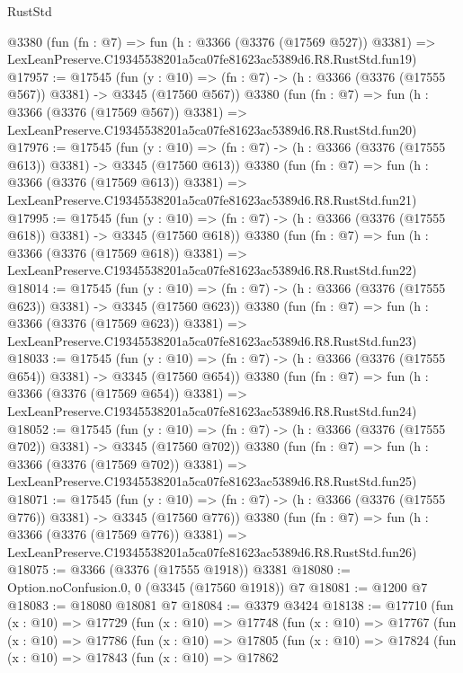 \begin{lexlean}{RustStd}
\begin{coremodule}
    @3380
    (fun (fn : @7) =>
    fun (h : @3366 (@3376 (@17569 @527)) @3381) =>
    LexLeanPreserve.C19345538201a5ca07fe81623ac5389d6.R8.RustStd.fun19)
@17957 := @17545
    (fun (y : @10) => (fn : @7) -> (h : @3366 (@3376 (@17555 @567)) @3381) -> @3345 (@17560 @567))
    @3380
    (fun (fn : @7) =>
    fun (h : @3366 (@3376 (@17569 @567)) @3381) =>
    LexLeanPreserve.C19345538201a5ca07fe81623ac5389d6.R8.RustStd.fun20)
@17976 := @17545
    (fun (y : @10) => (fn : @7) -> (h : @3366 (@3376 (@17555 @613)) @3381) -> @3345 (@17560 @613))
    @3380
    (fun (fn : @7) =>
    fun (h : @3366 (@3376 (@17569 @613)) @3381) =>
    LexLeanPreserve.C19345538201a5ca07fe81623ac5389d6.R8.RustStd.fun21)
@17995 := @17545
    (fun (y : @10) => (fn : @7) -> (h : @3366 (@3376 (@17555 @618)) @3381) -> @3345 (@17560 @618))
    @3380
    (fun (fn : @7) =>
    fun (h : @3366 (@3376 (@17569 @618)) @3381) =>
    LexLeanPreserve.C19345538201a5ca07fe81623ac5389d6.R8.RustStd.fun22)
@18014 := @17545
    (fun (y : @10) => (fn : @7) -> (h : @3366 (@3376 (@17555 @623)) @3381) -> @3345 (@17560 @623))
    @3380
    (fun (fn : @7) =>
    fun (h : @3366 (@3376 (@17569 @623)) @3381) =>
    LexLeanPreserve.C19345538201a5ca07fe81623ac5389d6.R8.RustStd.fun23)
@18033 := @17545
    (fun (y : @10) => (fn : @7) -> (h : @3366 (@3376 (@17555 @654)) @3381) -> @3345 (@17560 @654))
    @3380
    (fun (fn : @7) =>
    fun (h : @3366 (@3376 (@17569 @654)) @3381) =>
    LexLeanPreserve.C19345538201a5ca07fe81623ac5389d6.R8.RustStd.fun24)
@18052 := @17545
    (fun (y : @10) => (fn : @7) -> (h : @3366 (@3376 (@17555 @702)) @3381) -> @3345 (@17560 @702))
    @3380
    (fun (fn : @7) =>
    fun (h : @3366 (@3376 (@17569 @702)) @3381) =>
    LexLeanPreserve.C19345538201a5ca07fe81623ac5389d6.R8.RustStd.fun25)
@18071 := @17545
    (fun (y : @10) => (fn : @7) -> (h : @3366 (@3376 (@17555 @776)) @3381) -> @3345 (@17560 @776))
    @3380
    (fun (fn : @7) =>
    fun (h : @3366 (@3376 (@17569 @776)) @3381) =>
    LexLeanPreserve.C19345538201a5ca07fe81623ac5389d6.R8.RustStd.fun26)
@18075 := @3366 (@3376 (@17555 @1918)) @3381
@18080 := Option.noConfusion.{0, 0} (@3345 (@17560 @1918)) @7
@18081 := @1200 @7
@18083 := @18080 @18081 @7
@18084 := @3379 @3424
@18138 := @17710
    (fun (x : @10) =>
    @17729
      (fun (x : @10) =>
      @17748
        (fun (x : @10) =>
        @17767
          (fun (x : @10) =>
          @17786
            (fun (x : @10) =>
            @17805
              (fun (x : @10) =>
              @17824
                (fun (x : @10) =>
                @17843
                  (fun (x : @10) =>
                  @17862

\end{coremodule}
\end{lexlean}
